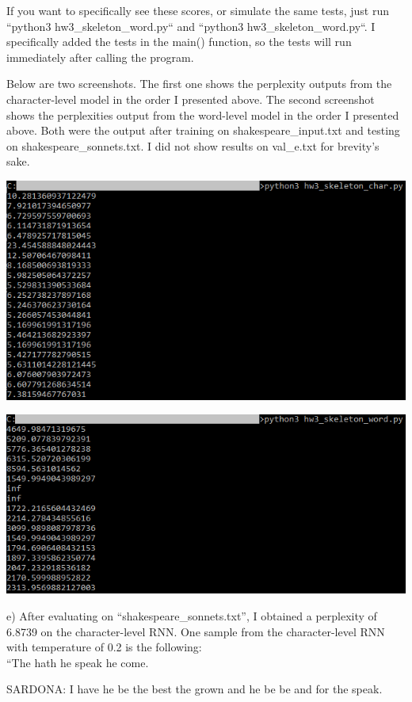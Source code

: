 \begin{solution}
If you want to specifically see these scores, or simulate the same tests, just run ``python3 hw3\_skeleton\_word.py`` and ``python3 hw3\_skeleton\_word.py``. I specifically added the tests in the main() function, so the tests will run immediately after calling the program.

Below are two screenshots. The first one shows the perplexity outputs from the character-level model in the order I presented above. The second screenshot shows the perplexities output from the word-level model in the order I presented above. Both were the output after training on shakespeare\_input.txt and testing on shakespeare\_sonnets.txt. I did not show results on val\_e.txt for brevity's sake.

\includegraphics[scale=0.9]{4d-character-model}

\includegraphics[scale=0.9]{4d-word-model}

e) After evaluating on ``shakespeare\_sonnets.txt'', I obtained a perplexity of 6.8739 on the character-level RNN. One sample from the character-level RNN with temperature of 0.2 is the following:\\

``The hath he speak he come.

SARDONA:
I have he be the best the grown and he be be and for the speak.


\end{solution}
